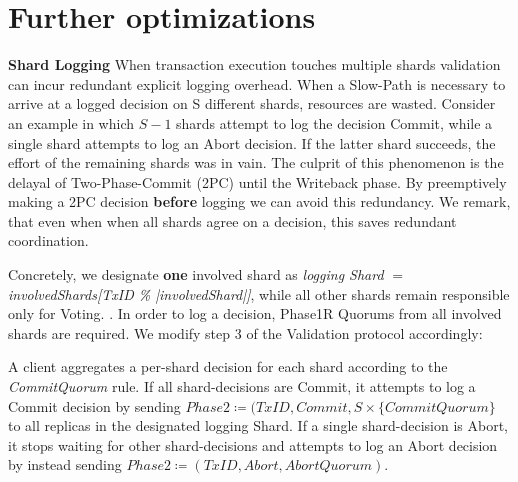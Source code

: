 \section{Further optimizations}


\par \textbf{Shard Logging} When transaction execution touches multiple shards validation can incur redundant explicit logging overhead. When a Slow-Path is necessary to arrive at a logged decision on S different shards, resources are wasted. Consider an example in which $S-1$ shards attempt to log the decision Commit, while a single shard attempts to log an Abort decision. If the latter shard succeeds, the effort of the remaining shards was in vain. 
The culprit of this phenomenon is the delayal of Two-Phase-Commit (2PC) until the Writeback phase. By preemptively making a 2PC decision \textbf{before} logging we can avoid this redundancy. We remark, that even when when all shards agree on a decision, this saves redundant coordination. 

Concretely, we designate \textbf{one} involved shard as \textit{logging Shard} $=$ \textit{involvedShards[TxID \% |involvedShard|]}, while all other shards remain responsible only for Voting. .  In order to log a decision, Phase1R Quorums  from all involved shards are required. We modify step 3 of the Validation protocol accordingly:

A client aggregates a per-shard decision for each shard according to the \textit{CommitQuorum} rule. If all shard-decisions are Commit, it attempts to log a Commit decision by sending $Phase2 \coloneqq (TxID, Commit, S \times \{CommitQuorum\}$ to all replicas in the designated logging Shard. If a single shard-decision is Abort, it stops waiting for other shard-decisions and attempts to log an Abort decision by instead sending $Phase2 \coloneqq (TxID, Abort, AbortQuorum)$. 

